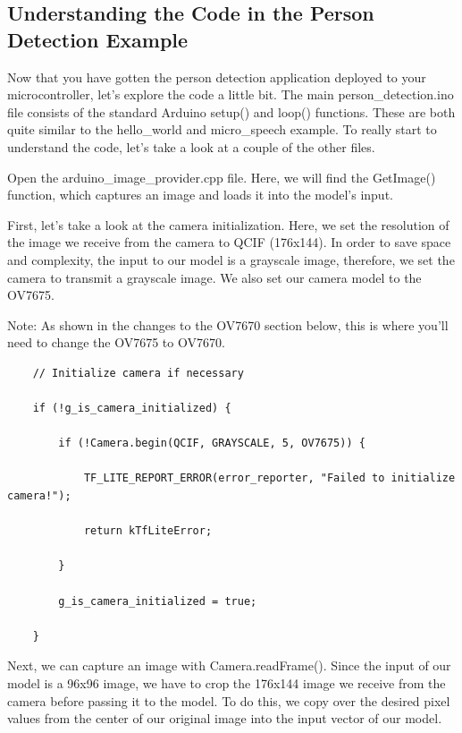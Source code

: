 \subsection{Understanding the Code in the Person Detection Example}

    Now that you have gotten the person detection application deployed to your microcontroller, let's explore the code a little bit. The main person\_detection.ino file consists of the standard Arduino setup() and loop() functions. These are both quite similar to the hello\_world and micro\_speech example. To really start to understand the code, let's take a look at a couple of the other files.
    
    Open the arduino\_image\_provider.cpp file. Here, we will find the GetImage() function, which captures an image and loads it into the model’s input.
    
    First, let’s take a look at the camera initialization. Here, we set the resolution of the image we receive from the camera to QCIF (176x144). In order to save space and complexity, the input to our model is a grayscale image, therefore, we set the camera to transmit a grayscale image. We also set our camera model to the OV7675.
    
    Note: As shown in the changes to the OV7670 section below, this is where you’ll need to change the OV7675 to OV7670.
    
  \begin{lstlisting}
    // Initialize camera if necessary
    
    if (!g_is_camera_initialized) {
        
        if (!Camera.begin(QCIF, GRAYSCALE, 5, OV7675)) {
            
            TF_LITE_REPORT_ERROR(error_reporter, "Failed to initialize camera!");
            
            return kTfLiteError;
            
        }
        
        g_is_camera_initialized = true;
        
    }
  \end{lstlisting}    
    
    Next, we can capture an image with Camera.readFrame(). Since the input of our model is a 96x96 image, we have to crop the 176x144 image we receive from the camera before passing it to the model. To do this, we copy over the desired pixel values from the center of our original image into the input vector of our model.
    
